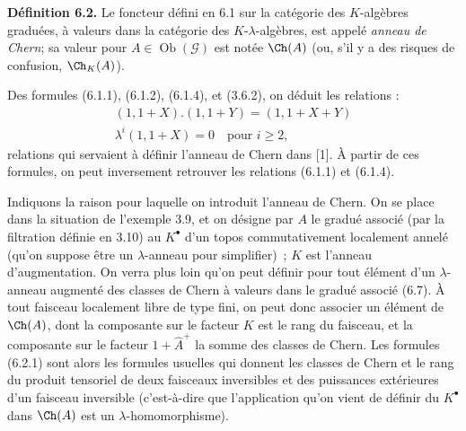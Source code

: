 \textbf{Définition 6.2.} Le foncteur défini en 6.1 sur la catégorie des \(K\)-algèbres graduées, à valeurs dans la catégorie des \(K\)-\(\lambda\)-algèbres, est appelé \emph{anneau de Chern}; sa valeur pour \(A\in\operatorname{Ob}(\mathcal G)\) est notée \(\Ch(A)\) (ou, s'il y a des risques de confusion, \(\Ch_K(A)\)).

Des formules (6.1.1), (6.1.2), (6.1.4), et (3.6.2), on déduit les relations :
\begin{equation}\tag{6.2.1}
\begin{gathered}
 (1,1+X).(1,1+Y)=(1,1+X+Y)\\
 \lambda^i(1,1+X)=0\quad\text{pour }i\ge2,
\end{gathered}
\end{equation}
relations qui servaient à définir l'anneau de Chern dans [1]. À partir de ces formules, on peut inversement retrouver les relations (6.1.1) et (6.1.4).

Indiquons la raison pour laquelle on introduit l'anneau de Chern. On se place dans la situation de l'exemple 3.9, et on désigne par \(A\) le gradué associé (par la filtration définie en 3.10) au \(K^\bullet\) d'un topos commutativement localement annelé (qu'on suppose être un \(\lambda\)-anneau pour simplifier)~; \(K\) est l'anneau d'augmentation. On verra plus loin qu'on peut définir pour tout élément d'un \(\lambda\)-anneau augmenté des classes de Chern à valeurs dans le gradué associé (6.7). À tout faisceau localement libre de type fini, on peut donc associer un élément de \(\Ch(A)\), dont la composante sur le facteur \(K\) est le rang du faisceau, et la composante sur le facteur \(1+\widehat A^+\) la somme des classes de Chern. Les formules (6.2.1) sont alors les formules usuelles qui donnent les classes de Chern et le rang du produit tensoriel de deux faisceaux inversibles et des puissances extérieures d'un faisceau inversible (c'est-à-dire que l'application qu'on vient de définir du \(K^\bullet\) dans \(\Ch(A)\) est un \(\lambda\)-homomorphisme).

